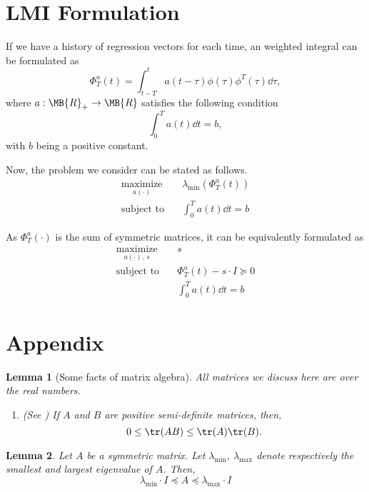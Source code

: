 \documentclass[nobib]{my-handout}
\newtheorem{lemma}{Lemma}
\begin{document}
\section{LMI Formulation}

If we have a history of regression vectors for each time, an weighted integral
can be formulated as
\[ \Phi_T^a(t) = \int_{t-T}^t a(t-\tau) \phi(\tau) \phi^T(\tau) \dd{\tau}, \]
where $a : \MB{R}_{+} \to \MB{R}$ satisfies the following condition
\[ \int_0^T a(t) \dd{t} = b, \]
with $b$ being a positive constant.

Now, the problem we consider can be stated as follows.
\begin{equation*}
	\begin{aligned}
		\operatorname*{maximize}_{a(\cdot)}\quad & \lambda_{\min} (\Phi_T^a(t)) \\
		\text{subject to}\quad & \int_0^T a(t) \dd{t} = b
	\end{aligned}
\end{equation*}

As $\Phi_T^a(\cdot)$ is the sum of symmetric matrices, it can be equivalently
formulated as
\begin{equation*}
	\begin{aligned}
		\operatorname*{maximize}_{a(\cdot),\ s}\quad & s \\
		\text{subject to}\quad & \Phi_T^a(t) - s \cdot I \succeq 0\\
		& \int_0^T a(t) \dd{t} = b
	\end{aligned}
\end{equation*}


\section{Appendix}

\begin{lemma}[Some facts of matrix algebra]
	All matrices we discuss here are over the real numbers.
	\begin{enumerate}
		\item (See \cite{ulukok_matrix_2010}) If $A$ and $B$ are positive
			semi-definite matrices, then, \[ 0 \le \tr(AB) \le \tr(A) \tr(B). \] 
	\end{enumerate}
\end{lemma}

\begin{lemma}
	Let $A$ be a symmetric matrix. Let $\lambda_{\min}$, $\lambda_{\max}$
	denote respectively the smallest and largest eigenvalue of $A$. Then,
	\[ \lambda_{\min} \cdot I \preceq A \preceq \lambda_{\max} \cdot I \]
\end{lemma}
\end{document}
